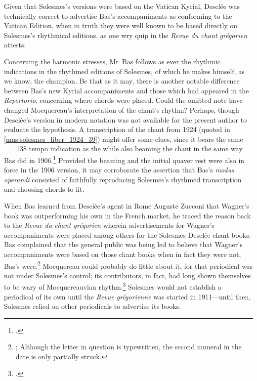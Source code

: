 Given that Solesmes's versions were based on the Vatican Kyrial, Desclée was technically correct to advertise Bas's accompaniments as conforming to the Vatican Edition, when in truth they were well known to be based directly on Solesmes's rhythmical editions, as one wry quip in the \emph{Revue du chant grégorien} attests:

  {\cite[178]{Bibliographiegregorienneeditions1906}\label{fn:bibkyriale}}
{Concerning the harmonic stresses, Mr~Bas follows as ever the rhythmic indications in the rhythmed editions of Solesmes, of which he makes himself, as we know, the champion.}
\noindent
Be that as it may, there is another notable difference between Bas's new Kyrial accompaniments and those which had appeared in the \emph{Repertorio}, concerning where chords were placed.
\label{sc:omitted_note}%
Could the omitted note have changed Mocquereau's interpretation of the chant's rhythm?
Perhaps, though Desclée's version in modern notation was not available for the present author to evaluate the hypothesis.
%
A transcription of the chant from 1924 (quoted in \cref{mus:solesmes_liber_1924_39}) might offer some clues, since it bears the same \quaver{}~=~138 tempo indication as the \ldo{} while also beaming the chant in the same way Bas did in 1906.\footcite[39]{Compendiumgradualisantiphonalis1924}
Provided the beaming and the initial quaver rest were also in force in the 1906 version, it may corroborate the assertion that Bas's \emph{modus operandi} consisted of faithfully reproducing Solesmes's rhythmed transcription and choosing chords to fit.

When Bas learned from Desclée's agent in Rome Auguste Zucconi that Wagner's book was outperforming his own in the French market, he traced the reason back to the \emph{Revue du chant grégorien} wherein advertisements for Wagner's accompaniments were placed among others for the Solesmes-Desclée chant books.
Bas complained that the general public was being led to believe that Wagner's accompaniments were based on those chant books when in fact they were not, Bas's were.\footnote{; Although the letter in question is typewritten, the second numeral in the date is only partially struck.}
Mocquereau could probably do little about it, for that periodical was not under Solesmes's control; its contributors, in fact, had long shown themselves to be wary of Mocquereauvian rhythm.\footcite[p.~42 n.~50, p.~72]{EllisPoliticsPlainchantfindesiecle2013}
Solesmes would not establish a periodical of its own until the \emph{Revue grégorienne} was started in 1911---until then, Solesmes relied on other periodicals to advertise its books.

